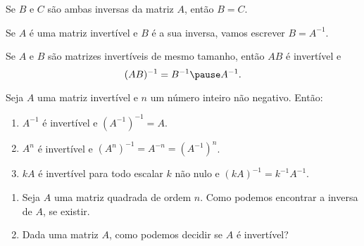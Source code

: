 \documentclass{beamer}
\begin{document}
    \begin{frame}
        \begin{teorema}
            Se $B$ e $C$ são ambas inversas da matriz $A$, \pause então $B = C$.\pause
        \end{teorema}

        \vspace{1cm}

        \begin{notacao}
            Se $A$ é uma matriz invertível \pause e $B$ é a sua inversa, \pause vamos escrever $B = A^{-1}$.
        \end{notacao}
    \end{frame}

    \begin{frame}
        \begin{proposicao}
            Se $A$ e $B$ são matrizes invertíveis de mesmo tamanho, \pause então $AB$ é invertível \pause e
            \[
            (AB)^{-1} = B^{-1}\pause A^{-1}.
            \]
        \end{proposicao}
    \end{frame}

    \begin{frame}
        \begin{proposicao}
            Seja $A$ uma matriz invertível \pause e $n$ um número inteiro não negativo. \pause Então:\pause
            \begin{enumerate}[label={\roman*})]
                \item $A^{-1}$ é invertível \pause e $(A^{-1})^{-1} = A$.\pause

                \item $A^n$ é invertível \pause e $(A^n)^{-1} = A^{-n} = (A^{-1})^n$.\pause

                \item $kA$ é invertível \pause para todo escalar $k$ não nulo \pause e $(kA)^{-1} = k^{-1}A^{-1}$.
            \end{enumerate}
        \end{proposicao}
    \end{frame}

    \begin{frame}
        \begin{enumerate}[label={\arabic*})]
            \item Seja $A$ uma matriz quadrada de ordem $n$. \pause Como podemos encontrar a inversa de $A$, \pause se existir.\pause

            \vspace{1cm}

            \item Dada uma matriz $A$, \pause como podemos decidir se $A$ é invertível?
        \end{enumerate}
    \end{frame}
\end{document}

